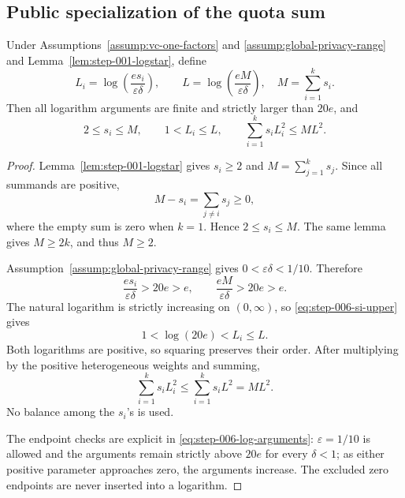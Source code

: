 \subsection{Public specialization of the quota sum}
\label{app:step-006}

\begin{lemma}
\label{lem:step-006-log-domination}
Under Assumptions~\ref{assump:vc-one-factors} and
\ref{assump:global-privacy-range} and
Lemma~\ref{lem:step-001-logstar}, define
\begin{equation}\label{eq:step-006-log-definitions}
L_i=\log\!\left(\frac{e s_i}{\varepsilon\delta}\right),
\qquad
L=\log\!\left(\frac{eM}{\varepsilon\delta}\right),
\quad M=\sum_{i=1}^ks_i.
\end{equation}
Then all logarithm arguments are finite and strictly larger than \(20e\),
and
\begin{equation}\label{eq:step-006-log-domination}
2\le s_i\le M,\qquad
1<L_i\le L,\qquad
\sum_{i=1}^ks_iL_i^2\le ML^2.
\end{equation}
\end{lemma}

\begin{proof}
Lemma~\ref{lem:step-001-logstar} gives \(s_i\ge2\) and
\(M=\sum_{j=1}^ks_j\).  Since all summands are positive,
\begin{equation}\label{eq:step-006-si-upper}
M-s_i=\sum_{j\ne i}s_j\ge0,
\end{equation}
where the empty sum is zero when \(k=1\).  Hence \(2\le s_i\le M\).
The same lemma gives \(M\ge2k\), and thus \(M\ge2\).

Assumption~\ref{assump:global-privacy-range} gives
\(0<\varepsilon\delta<1/10\).  Therefore
\begin{equation}\label{eq:step-006-log-arguments}
\frac{es_i}{\varepsilon\delta}>20e>e,
\qquad
\frac{eM}{\varepsilon\delta}>20e>e.
\end{equation}
The natural logarithm is strictly increasing on \((0,\infty)\), so
\eqref{eq:step-006-si-upper} gives
\begin{equation}\label{eq:step-006-log-order}
1<\log(20e)<L_i\le L.
\end{equation}
Both logarithms are positive, so squaring preserves their order.  After
multiplying by the positive heterogeneous weights and summing,
\begin{equation}\label{eq:step-006-heterogeneous-sum}
\sum_{i=1}^ks_iL_i^2
\le\sum_{i=1}^ks_iL^2=ML^2.
\end{equation}
No balance among the \(s_i\)'s is used.

The endpoint checks are explicit in
\eqref{eq:step-006-log-arguments}: \(\varepsilon=1/10\) is allowed and
the arguments remain strictly above \(20e\) for every \(\delta<1\); as
either positive parameter approaches zero, the arguments increase.  The
excluded zero endpoints are never inserted into a logarithm.
\end{proof}

